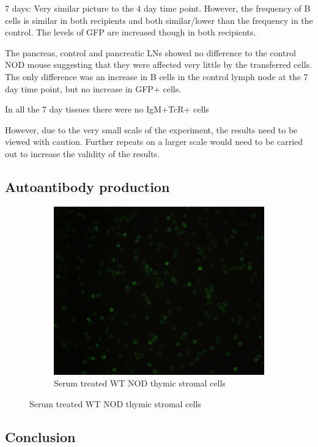 7 days:
Very similar picture to the 4 day time point.
However, the frequency of B cells is similar in both recipients and both similar/lower than the frequency in the control.
The levels of GFP are increased though in both recipients.


The pancreas, control and pancreatic LNs showed no difference to the control NOD mouse suggesting that they were affected very little by the transferred cells. 
The only difference was an increase in B cells in the control lymph node at the 7 day time point, but no increase in GFP+ cells.

In all the 7 day tissues there were no IgM+TcR+ cells



However, due to the very small scale of the experiment, the results need to be viewed with caution.
Further repeats on a larger scale would need to be carried out to increase the validity of the results.

\subsection{Autoantibody production}



\begin{figure}
	\begin{subfigure}{\textwidth}
		\includegraphics[width=\textwidth]{Figures/WTserum2.jpg}
		\caption{Serum treated WT NOD thymic stromal cells}
	\end{subfigure}
\end{figure}

\subsection{Conclusion}


